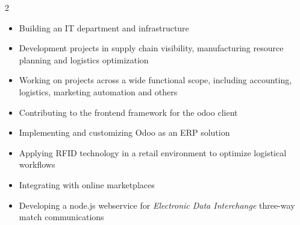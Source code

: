 \documentclass[10pt,a4paper,ragged2e,withhyper]{altacv}
\begin{document}
\begin{paracol}{2}


\begin{itemize}
\item Building an IT department and infrastructure
\item Development projects in supply chain visibility, manufacturing resource planning and logistics optimization
\end{itemize}

\divider

\begin{itemize}
\item Working on projects across a wide functional scope, including accounting, logistics, marketing automation and others
\item Contributing to the frontend framework for the odoo client
\end{itemize}

\divider

\begin{itemize}
\item Implementing and customizing Odoo as an ERP solution
\item Applying RFID technology in a retail environment to optimize logistical workflows
\item Integrating with online marketplaces
\end{itemize}

\divider

\begin{itemize}
\item Developing a node.js webservice for \emph{Electronic Data Interchange} three-way match communications
\end{itemize}

\divider



\end{paracol}
\end{document}
